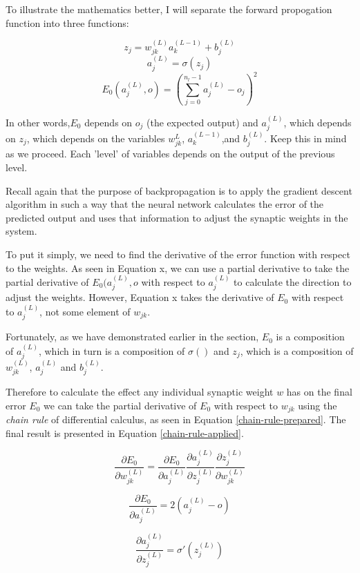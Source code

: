 \documentclass[12pt]{article}
\begin{document}
To illustrate the mathematics better, I will separate the forward propogation function into three functions:

\[ z_j = w_{jk}^{ (L)}a_k^{(L-1)} + b_j^{(L)} \]
\[ a_j^{(L)} =\sigma (z_j) \]
\[ E_0(a_j^{(L)}, o) = (\sum_{j=0}^{n_l-1} a_j^{(L)} - o_j)^2 \]

In other words,$E_0$ depends on $o_j$ (the expected output) and $a_j^{(L)}$, which depends on $z_j$, which depends on the variables $w_{jk}^{L}$, $a_k^{(L-1)}$,and $b_j^{(L)}$. Keep this in mind as we proceed. Each 'level' of variables depends on the output of the previous level.

Recall again that the purpose of backpropagation is to apply the gradient descent algorithm in such a way that the neural network calculates the error of the predicted output and uses that information to adjust the synaptic weights in the system.

To put it simply, we need to find the derivative of the error function with respect to the weights. As seen in Equation x, we can use a partial derivative to take the partial derivative of \(E_0(a_j^{(L)}, o\) with respect to \(a_j^{(L)}\) to calculate the direction to adjust the weights. However, Equation x takes the derivative of \(E_0\) with respect to \(a_j^{(L)}\), not some element of $w_{jk}$.

Fortunately, as we have demonstrated earlier in the section, $E_0$ is a composition of $a_j^{(L)}$, which in turn is a composition of $\sigma ()$ and $z_j$, which is a composition of $w_{jk}^{(L)}$, $a_j^{(L)}$ and $b_j^{(L)}$.

Therefore to calculate the effect any individual synaptic weight $w$ has on the final error $E_0$ we can take the partial derivative of $E_0$ with respect to $w_{jk}$ using the \textit{chain rule} of differential calculus, as seen in Equation \ref{chain-rule-prepared}. The final result is presented in Equation \ref{chain-rule-applied}.

\begin{equation} \label{chain-rule-prepared}
  \frac{\partial E_0}{\partial w_{jk}^{(L)}} = \frac{\partial E_0}{\partial a_j^{(L)}} \frac{\partial a_j^{(L)}}{\partial z_j^{(L)}} \frac{\partial z_j^{(L)}}{\partial w_{jk}^{(L)}}
\end{equation}

\[ \frac{\partial E_0}{\partial a_j^{(L)}} = 2 (a_j^{(L)} - o)\]

\[ \frac{\partial a_j^{(L)}}{\partial z_j^{(L)}} = \sigma '(z_j^{(L)}) \]
\end{document}
